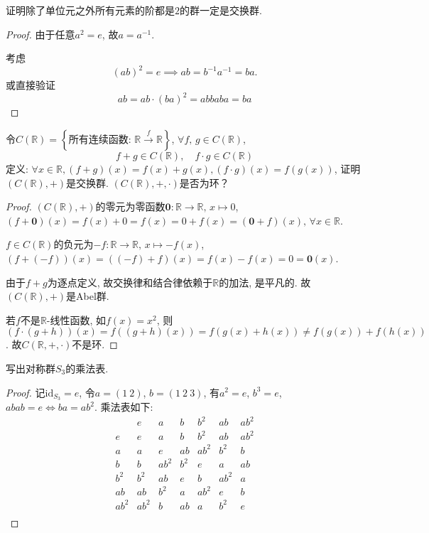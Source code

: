 \begin{problem}
    证明除了单位元之外所有元素的阶都是$2$的群一定是交换群.
\end{problem}

\begin{proof}
    由于任意$a^2 = e$, 故$a = a^{-1}$.

    考虑
    \[
        (ab)^2 = e \implies ab = b^{-1}a^{-1} = ba.
    \]
    或直接验证
    \[
        ab = ab \cdot (ba)^2 = abbaba = ba
    \]
\end{proof}

\begin{problem}
    令$C(\mathbb{R} ) = \left\{\text{所有连续函数: } \mathbb{R} \overset{f}\to \mathbb{R} \right\}$, $\forall f ,\, g \in C(\mathbb{R})$,
    \[
        f + g \in C(\mathbb{R}),\quad f \cdot g \in C(\mathbb{R})
    \]
    定义: $\forall x \in \mathbb{R}, (f + g)(x) = f(x) + g(x), (f \cdot g)(x) = f(g(x))$, 证明$(C(\mathbb{R}), +)$是交换群. $(C(\mathbb{R}), +, \cdot)$是否为环？
\end{problem}

\begin{proof}
    $(C(\mathbb{R}), +)$的零元为零函数$\mathbf{0}: \mathbb{R} \to \mathbb{R},\, x \mapsto 0$, $(f + \mathbf{0})(x) = f(x) + 0 = f(x) = 0 + f(x) = (\mathbf{0} + f)(x),\, \forall x \in \mathbb{R}$.

    $f \in C(\mathbb{R})$的负元为$-f: \mathbb{R} \to \mathbb{R},\, x \mapsto -f(x)$, $(f + (-f))(x) = ((-f) + f)(x) = f(x) - f(x) = 0 = \mathbf{0}(x)$.

    由于$f + g$为逐点定义, 故交换律和结合律依赖于$\mathbb{R}$的加法, 是平凡的. 故$(C(\mathbb{R}), +)$是Abel群.

    若$f$不是$\mathbb{R}$-线性函数, 如$f(x) = x^2$, 则$(f \cdot (g + h))(x) = f((g + h)(x)) = f(g(x) + h(x)) \neq f(g(x)) + f(h(x))$. 故$C(\mathbb{R}, +, \cdot)$不是环.
\end{proof}

\begin{problem}\label{ex:1.3.5}
    写出对称群$S_3$的乘法表.
\end{problem}

\begin{proof}
    记$\mathrm{id}_{S_3} = e$, 令$a = (1\:2)$, $b = (1\:2\:3)$, 有$a^2 = e$, $b^3 = e$, $abab = e \iff ba = ab^2$. 乘法表如下:
    \[
    \begin{array}{c|cccccc}
             & e    & a    & b   & b^2  & ab   & ab^2 \\
        \hline
        e    & e    & a    & b   & b^2  & ab   & ab^2 \\
        a    & a    & e    & ab  & ab^2 & b^2  & b \\
        b    & b    & ab^2 & b^2 & e    & a    & ab \\
        b^2  & b^2  & ab   & e   & b    & ab^2 & a \\
        ab   & ab   & b^2  & a   & ab^2 & e    & b \\
        ab^2 & ab^2 & b    & ab  & a    & b^2  & e \\
    \end{array}
    \]
\end{proof}

